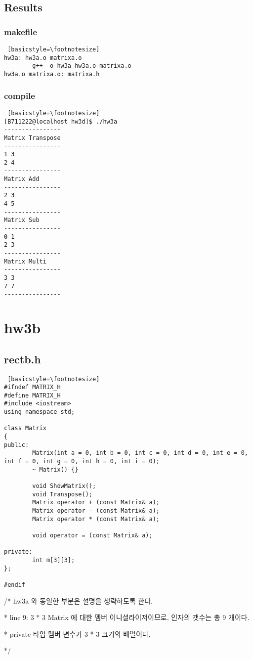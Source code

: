 \documentclass[twoside,twocolumn]{article}
\newenvironment{itemizeReduced}{
\begin{list}{\labelitemi}{\leftmargin=1em}
\setlength{\itemsep}{1pt}
\setlength{\parskip}{0pt}
\setlength{\parsep}{0pt}}{\end{list}
}
\begin{document}
\subsection{Results}
\subsubsection{makefile}
\begin{lstlisting} [basicstyle=\footnotesize]
hw3a: hw3a.o matrixa.o
        g++ -o hw3a hw3a.o matrixa.o
hw3a.o matrixa.o: matrixa.h
\end{lstlisting}

\subsubsection{compile}
\begin{lstlisting} [basicstyle=\footnotesize]
[B711222@localhost hw3d]$ ./hw3a
----------------
Matrix Transpose
----------------
1 3
2 4
----------------
Matrix Add
----------------
2 3
4 5
----------------
Matrix Sub
----------------
0 1
2 3
----------------
Matrix Multi
----------------
3 3
7 7
----------------
\end{lstlisting}

\clearpage

\section{hw3b}
\subsection{rectb.h}
\begin{lstlisting} [basicstyle=\footnotesize]
#ifndef MATRIX_H
#define MATRIX_H
#include <iostream>
using namespace std;

class Matrix
{
public:
        Matrix(int a = 0, int b = 0, int c = 0, int d = 0, int e = 0, int f = 0, int g = 0, int h = 0, int i = 0);
        ~ Matrix() {}

        void ShowMatrix();
        void Transpose();
        Matrix operator + (const Matrix& a);
        Matrix operator - (const Matrix& a);
        Matrix operator * (const Matrix& a);

        void operator = (const Matrix& a);

private:
        int m[3][3];
};

#endif
\end{lstlisting}
\begin{itemizeReduced}
    \item[/*] hw3a 와 동일한 부분은 설명을 생략하도록 한다.
    \item[*] line 9: 3 * 3 Matrix 에 대한 멤버 이니셜라이저이므로, 인자의 갯수는 총 9 개이다.
    \item[*] private 타입 멤버 변수가 3 * 3 크기의 배열이다.
\end{itemizeReduced}
*/
\end{document}
